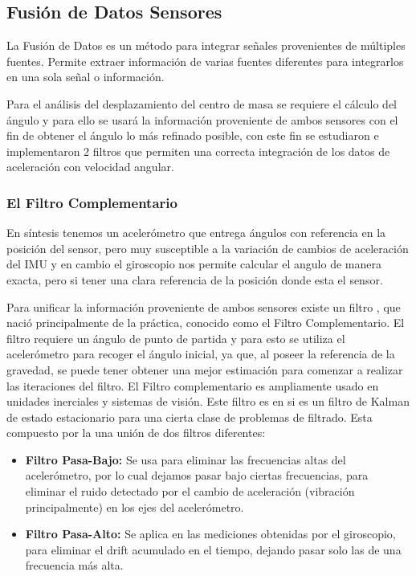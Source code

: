 \documentclass[12pt,a4paper]{article}
\begin{document}
\subsection{Fusión de Datos Sensores}
La Fusión de Datos es un método para integrar señales provenientes de múltiples fuentes. Permite extraer información de varias fuentes diferentes para integrarlos en una sola señal o información.

Para el análisis del desplazamiento del centro de masa se requiere el cálculo del ángulo y para ello se usará la información proveniente de ambos sensores con el fin de obtener el ángulo lo más refinado posible, con este fin se estudiaron e implementaron 2 filtros que permiten una correcta integración de los datos de aceleración con velocidad angular.

\subsubsection{El Filtro Complementario}

En síntesis tenemos un acelerómetro que entrega ángulos con referencia en la posición del sensor, pero muy susceptible a la variación de cambios de aceleración del IMU y en cambio el giroscopio nos permite calcular el angulo de manera exacta, pero si tener una clara referencia de la posición donde esta el sensor. 

Para unificar la información proveniente de ambos sensores existe un filtro , que nació principalmente de la práctica, conocido como el Filtro Complementario.
El filtro requiere un ángulo de punto de partida y para esto se utiliza el acelerómetro para recoger el ángulo inicial, ya que, al poseer la referencia de la gravedad, se puede tener obtener una mejor estimación para comenzar a realizar las iteraciones del filtro.
\newline
El Filtro complementario es ampliamente usado en unidades inerciales y sistemas de visión. Este filtro es en si es un filtro de Kalman de estado estacionario para una cierta clase de problemas de filtrado.
Esta compuesto por la una unión de dos filtros diferentes:
\begin{itemize}
\item \textbf{Filtro Pasa-Bajo:} Se usa para eliminar las frecuencias altas del acelerómetro, por lo cual dejamos pasar bajo ciertas frecuencias, para eliminar el ruido detectado por el cambio de aceleración (vibración principalmente) en los ejes del acelerómetro.
\item \textbf{Filtro Pasa-Alto:} Se aplica en las mediciones obtenidas por el giroscopio, para eliminar el drift acumulado en el tiempo, dejando pasar solo las de una frecuencia más alta.
\end{itemize}
\end{document}
